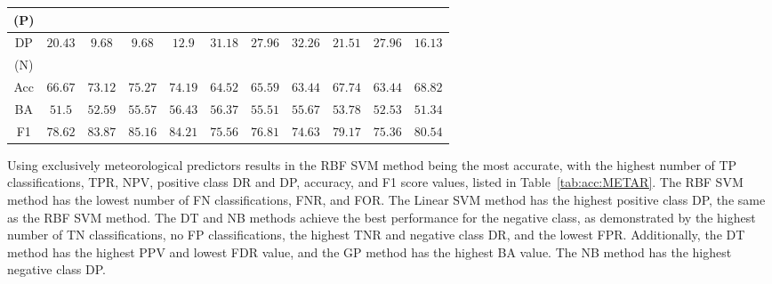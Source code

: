 \let\LaTeXcline\cline\documentclass[sn-mathphys-num]{sn-jnl}\let\cline\LaTeXcline
\begin{document}
\begin{table}[!ht]
\begin{tabular}{|c|c|c|c|c|c|c|c|c|c|c|}
        (P) & & & & & & & & & & \\ \hline
        DP & \multirow{2}{*}{$20.43$} & \multirow{2}{*}{$9.68$} & \multirow{2}{*}{$9.68$} & \multirow{2}{*}{$12.9$} & \multirow{2}{*}{$31.18$} & \multirow{2}{*}{$27.96$} & \multirow{2}{*}{$\mathbf{32.26}$} & \multirow{2}{*}{$21.51$} & \multirow{2}{*}{$27.96$} & \multirow{2}{*}{$16.13$} \\
        (N) & & & & & & & & & & \\ \hline
        Acc & $66.67$ & $73.12$ & $\mathbf{75.27}$ & $74.19$ & $64.52$ & $65.59$ & $63.44$ & $67.74$ & $63.44$ & $68.82$ \\ \hline
        BA & $51.5$ & $52.59$ & $55.57$ & $\mathbf{56.43}$ & $56.37$ & $55.51$ & $55.67$ & $53.78$ & $52.53$ & $51.34$ \\ \hline
        F1 & $78.62$ & $83.87$ & $\mathbf{85.16}$ & $84.21$ & $75.56$ & $76.81$ & $74.63$ & $79.17$ & $75.36$ & $80.54$ \\ \hline
	\end{tabular}
\end{table}

Using exclusively meteorological predictors results in the RBF SVM method being the most accurate, with the highest number of TP classifications, TPR, NPV, positive class DR and DP, accuracy, and F1 score values, listed in Table~\ref{tab:acc:METAR}. The RBF SVM method has the lowest number of FN classifications, FNR, and FOR. The Linear SVM method has the highest positive class DP, the same as the RBF SVM method. The DT and NB methods achieve the best performance for the negative class, as demonstrated by the highest number of TN classifications, no FP classifications, the highest TNR and negative class DR, and the lowest FPR. Additionally, the DT method has the highest PPV and lowest FDR value, and the GP method has the highest BA value. The NB method has the highest negative class DP.
        
\end{document}
